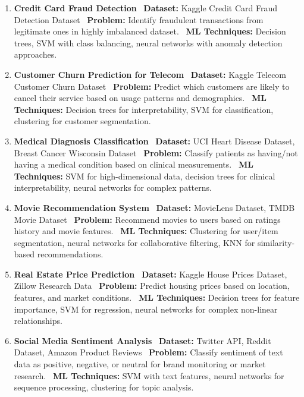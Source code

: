 \documentclass{article}
\begin{document}
\begin{enumerate}
\item \textbf{Credit Card Fraud Detection} \
\textbf{Dataset:} Kaggle Credit Card Fraud Detection Dataset \
\textbf{Problem:} Identify fraudulent transactions from legitimate ones in highly imbalanced dataset. \
\textbf{ML Techniques:} Decision trees, SVM with class balancing, neural networks with anomaly detection approaches.

\item \textbf{Customer Churn Prediction for Telecom} \
\textbf{Dataset:} Kaggle Telecom Customer Churn Dataset \
\textbf{Problem:} Predict which customers are likely to cancel their service based on usage patterns and demographics. \
\textbf{ML Techniques:} Decision trees for interpretability, SVM for classification, clustering for customer segmentation.

\item \textbf{Medical Diagnosis Classification} \
\textbf{Dataset:} UCI Heart Disease Dataset, Breast Cancer Wisconsin Dataset \
\textbf{Problem:} Classify patients as having/not having a medical condition based on clinical measurements. \
\textbf{ML Techniques:} SVM for high-dimensional data, decision trees for clinical interpretability, neural networks for complex patterns.

\item \textbf{Movie Recommendation System} \
\textbf{Dataset:} MovieLens Dataset, TMDB Movie Dataset \
\textbf{Problem:} Recommend movies to users based on ratings history and movie features. \
\textbf{ML Techniques:} Clustering for user/item segmentation, neural networks for collaborative filtering, KNN for similarity-based recommendations.

\item \textbf{Real Estate Price Prediction} \
\textbf{Dataset:} Kaggle House Prices Dataset, Zillow Research Data \
\textbf{Problem:} Predict housing prices based on location, features, and market conditions. \
\textbf{ML Techniques:} Decision trees for feature importance, SVM for regression, neural networks for complex non-linear relationships.

\item \textbf{Social Media Sentiment Analysis} \
\textbf{Dataset:} Twitter API, Reddit Dataset, Amazon Product Reviews \
\textbf{Problem:} Classify sentiment of text data as positive, negative, or neutral for brand monitoring or market research. \
\textbf{ML Techniques:} SVM with text features, neural networks for sequence processing, clustering for topic analysis.


\end{enumerate}
\end{document}
